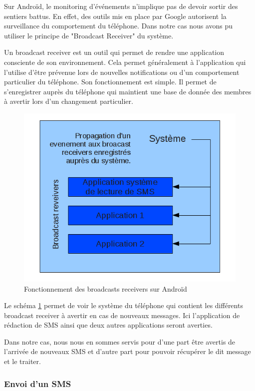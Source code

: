 Sur Androïd, le monitoring d’événements n'implique pas de devoir sortir des sentiers battus. En effet,
des outils mis en place par Google autorisent la surveillance du comportement du téléphone. Dans notre cas 
nous avons pu utiliser le principe de "Broadcast Receiver" du système. 
 
Un broadcast receiver est un outil qui permet de rendre une application consciente de son environnement.
Cela permet généralement à l'application qui l'utilise d’être prévenue lors de nouvelles notifications ou 
d'un comportement particulier du téléphone.
Son fonctionnement est simple. Il permet de s'enregistrer auprès du téléphone qui maintient une base de donnée des 
membres à avertir lors d'un changement particulier.
 
\begin{figure}[!h]
  \center
  \includegraphics[width=12cm]{img/broadcast-receivers.png}
  \caption{Fonctionnement des broadcasts receivers sur Androïd}
  \label{broadcast-receivers}
\end{figure}
 
Le schéma \ref{broadcast-receivers} permet de voir le système du téléphone qui contient les différents broadcast receiver à avertir en cas de nouveaux messages. Ici l'application de rédaction de SMS ainsi que deux autres 
applications seront averties.
 
Dans notre cas, nous nous en sommes servis pour d'une part être avertis de l'arrivée de nouveaux SMS et d'autre part pour pouvoir récupérer le dit message et le traiter.
\\
 
 
\subsubsection{Envoi d'un SMS}
 
